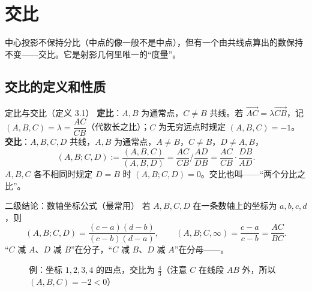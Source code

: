 \section{交比}

中心投影不保持分比（中点的像一般不是中点），但有一个由共线点算出的数保持不变——交比。它是射影几何里唯一的“度量”。

\subsection{交比的定义和性质}

\begin{defbox}{定比与交比（定义 3.1）}
\textbf{定比}：$A,B$ 为通常点，$C\neq B$ 共线。若 $\overrightarrow{AC}=\lambda\overrightarrow{CB}$，记 $(A,B,C)=\lambda=\dfrac{AC}{CB}$（代数长之比）；$C$ 为无穷远点时规定 $(A,B,C)=-1$。\\[2pt]
\textbf{交比}：$A,B,C,D$ 共线，$A,B$ 为通常点，$A\neq B$，$C\neq B$，$D\neq A,B$，
\begin{equation}
(A,B;C,D):=\frac{(A,B,C)}{(A,B,D)}=\frac{AC}{CB}\Big/\frac{AD}{DB}=\frac{AC}{CB}\cdot\frac{DB}{AD}.
\end{equation}
$A,B,C$ 各不相同时规定 $D=B$ 时 $(A,B;C,D)=0$。交比也叫——“两个分比之比”。
\end{defbox}

\begin{thmbox}{二级结论：数轴坐标公式（最常用）}
若 $A,B,C,D$ 在一条数轴上的坐标为 $a,b,c,d$，则
\[
(A,B;C,D)=\frac{(c-a)(d-b)}{(c-b)(d-a)},\qquad (A,B;C,\infty)=\frac{c-a}{c-b}=\frac{AC}{BC}.
\]
\ji “$C$ 减 $A$、$D$ 减 $B$”在分子，“$C$ 减 $B$、$D$ 减 $A$”在分母——。
\end{thmbox}

\begin{figure}[htbp]
\centering
{}
\caption{例：坐标 $1,2,3,4$ 的四点，交比为 $\frac43$（注意 $C$ 在线段 $AB$ 外，所以 $(A,B,C)=-2<0$）}
\end{figure}

